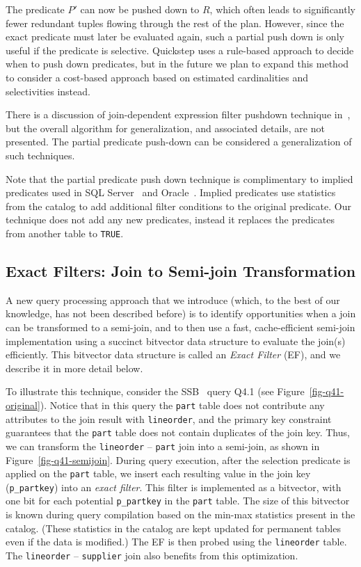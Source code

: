 The predicate $P'$ can now be pushed down to $R$, which often leads to significantly fewer redundant tuples flowing through the rest of the plan. However, since the exact predicate must later be evaluated again, such a partial push down is only useful if the predicate is selective. Quickstep uses a rule-based approach to decide when to push down predicates, but in the future we plan to expand this method to consider a cost-based approach based on estimated cardinalities and selectivities instead.

There is a discussion of join-dependent expression filter pushdown technique in~\cite{BonczNE13}, but the overall algorithm for generalization, and associated details, are not presented. 
The partial predicate push-down can be considered a generalization of such techniques.

Note that the partial predicate push down technique is complimentary to implied predicates used in SQL Server~\cite{sql-server-implied-predicate} and Oracle~\cite{oracle-implied-predicate}.
Implied predicates use statistics from the catalog to add additional filter conditions to the original predicate.
Our technique does not add any new predicates, instead it replaces the predicates from another table to \texttt{TRUE}.

\subsection{Exact Filters: Join to Semi-join Transformation} \label{sec:ef}
A new query processing approach that we introduce (which, to the best of our knowledge, has not been described before) is to identify opportunities when a join can be transformed to a semi-join, and to then use a  fast, cache-efficient semi-join implementation using a succinct bitvector data structure to evaluate the join(s) efficiently. This bitvector data structure is called an \textit{Exact Filter} (EF), and we describe it in more detail below.

To illustrate this technique, consider the SSB~\cite{ssb} query Q4.1 (see Figure~\ref{fig-q41-original}). Notice that in this query the \texttt{part} table does not contribute any attributes to the join result with \texttt{lineorder}, and the primary key constraint guarantees that the \texttt{part} table does not contain duplicates of the join key. Thus, we can transform the \texttt{lineorder} -- \texttt{part} join into a semi-join, as shown in Figure~\ref{fig-q41-semijoin}. During query execution, after the selection predicate is applied on the \texttt{part} table, we insert each resulting value in the join key (\texttt{p\_partkey}) into an \textit{exact filter}. This filter is implemented as a bitvector, with one bit for each potential \texttt{p\_partkey} in the  \texttt{part} table. The size of this bitvector is known during query compilation based on the min-max statistics present in the catalog. (These statistics in the catalog are  kept updated for permanent tables even if the data is modified.) The EF is then probed using the \texttt{lineorder} table. The \texttt{lineorder} -- \texttt{supplier} join also benefits from this optimization.

